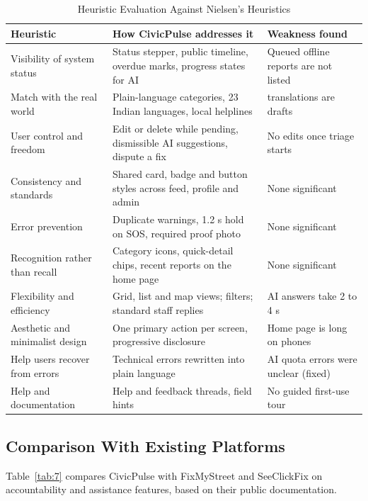 \documentclass[conference]{IEEEtran}
\begin{document}
\begin{table}[htbp]
\caption{Heuristic Evaluation Against Nielsen's Heuristics}
\label{tab:6}
\begin{center}
\footnotesize
\begin{tabular}{|>{\raggedright\arraybackslash}p{}|>{\raggedright\arraybackslash}p{}|>{\raggedright\arraybackslash}p{}|}
\hline
\textbf{Heuristic} & \textbf{How CivicPulse addresses it} & \textbf{Weakness found} \\
\hline
Visibility of system status & Status stepper, public timeline, overdue marks, progress states for AI & Queued offline reports are not listed \\ \hline
Match with the real world & Plain-language categories, 23 Indian languages, local helplines & 5 translations are drafts \\ \hline
User control and freedom & Edit or delete while pending, dismissible AI suggestions, dispute a fix & No edits once triage starts \\ \hline
Consistency and standards & Shared card, badge and button styles across feed, profile and admin & None significant \\ \hline
Error prevention & Duplicate warnings, 1.2 s hold on SOS, required proof photo & None significant \\ \hline
Recognition rather than recall & Category icons, quick-detail chips, recent reports on the home page & None significant \\ \hline
Flexibility and efficiency & Grid, list and map views; filters; standard staff replies & AI answers take 2 to 4 s \\ \hline
Aesthetic and minimalist design & One primary action per screen, progressive disclosure & Home page is long on phones \\ \hline
Help users recover from errors & Technical errors rewritten into plain language & AI quota errors were unclear (fixed) \\ \hline
Help and documentation & Help and feedback threads, field hints & No guided first-use tour \\ \hline
\end{tabular}
\end{center}
\end{table}
\subsection{Comparison With Existing Platforms}
Table~\ref{tab:7} compares CivicPulse with FixMyStreet and SeeClickFix on accountability and assistance features, based on their public documentation.
\end{document}

